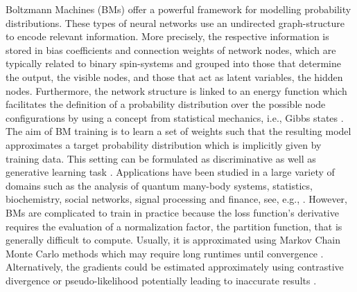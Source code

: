\documentclass[twocolumn, aps, pra, superscriptaddress, floatfix]{revtex4}
\begin{document}
Boltzmann Machines (BMs) \cite{HintonBM1985, Du2019BM} offer a powerful framework for modelling probability distributions. 
These types of neural networks use an undirected graph-structure to encode relevant information. 
More precisely, the respective information is stored in bias coefficients and connection weights of network nodes, which are typically related to binary spin-systems and grouped into those that determine the output, the visible nodes, and those that act as latent variables, the hidden nodes.
Furthermore, the network structure is linked to an energy function which facilitates the definition of a probability distribution over the possible node configurations by using a concept from statistical mechanics, i.e., Gibbs states \cite{Boltzmann1877, gibbs02}.
The aim of BM training is to learn a set of weights such that the resulting model approximates a target probability distribution which is implicitly given by training data. 
This setting can be formulated as discriminative as well as generative learning task \cite{Liu2010}.
Applications have been studied in a large variety of domains such as the analysis of quantum many-body systems, statistics, biochemistry, social networks, signal processing and finance, see, e.g., \cite{CarleoRBMsQManyBody18, CarleoRBMsQuantumManyBody17, YusukeRBM17, AnshuSample-efficientQManyBody, Melko2019, HRASKO2015RBMTimeSeries, Tubiana19RBMProteins, LiuRBMsSocialNetworks13, Mohamed10RBMSignal, Assis18RBMFin}.
However, BMs are complicated to train in practice because the loss function's derivative requires the evaluation of a normalization factor, the partition function, that is generally difficult to compute.
Usually, it is approximated using Markov Chain Monte Carlo methods which may require long runtimes until convergence \cite{Hinton05CD, MurphyML12}. Alternatively, the gradients could be estimated approximately using contrastive divergence \cite{Hinton2002TrainingPO} or pseudo-likelihood \cite{Besag1975} potentially leading to inaccurate results \cite{Tieleman08, Sutskever10}.
\end{document}
